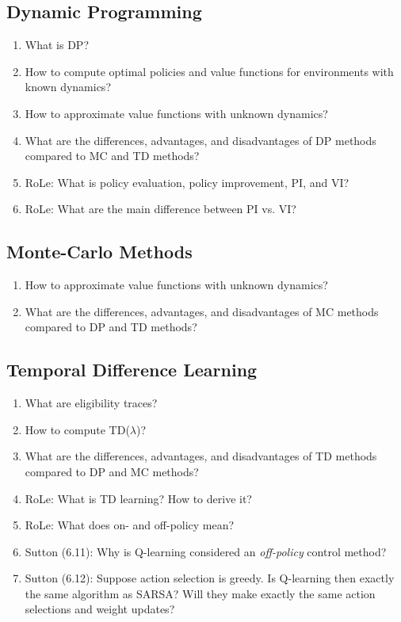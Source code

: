 		\subsection{Dynamic Programming}
			\begin{enumerate}
				\item What is \ac{DP}?
				\item How to compute optimal policies and value functions for environments with known dynamics?
				\item How to approximate value functions with unknown dynamics?
				\item What are the differences, advantages, and disadvantages of \ac{DP} methods compared to \ac{MC} and \ac{TD} methods?
				\item RoLe: What is policy evaluation, policy improvement, \ac{PI}, and \ac{VI}?
				\item RoLe: What are the main difference between \ac{PI} vs. \ac{VI}?
			\end{enumerate}

		\subsection{Monte-Carlo Methods}
			\begin{enumerate}
				\item How to approximate value functions with unknown dynamics?
				\item What are the differences, advantages, and disadvantages of \ac{MC} methods compared to \ac{DP} and \ac{TD} methods?
			\end{enumerate}

		\subsection{Temporal Difference Learning}
			\begin{enumerate}
				\item What are eligibility traces?
				\item How to compute \acs{TD}(\(\lambda\))?
				\item What are the differences, advantages, and disadvantages of \ac{TD} methods compared to \ac{DP} and \ac{MC} methods?
				\item RoLe: What is \ac{TD} learning? How to derive it?
				\item RoLe: What does on- and off-policy mean?
				\item Sutton (6.11): Why is Q-learning considered an \emph{off-policy} control method?
				\item Sutton (6.12): Suppose action selection is greedy. Is Q-learning then exactly the same algorithm as \ac{SARSA}? Will they make exactly the same action selections and weight updates?
			\end{enumerate}


